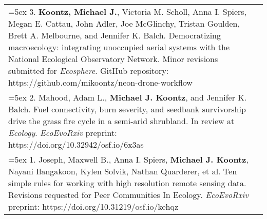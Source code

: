\begin{longtable}{@{} >{\raggedright}p{6.10in} >{\raggedleft}X @{}}

\hangindent=5ex 3. \textbf{Koontz, Michael J.}, Victoria M. Scholl, Anna I. Spiers, Megan E. Cattau, John Adler, Joe McGlinchy, Tristan Goulden, Brett A. Melbourne, and Jennifer K. Balch. Democratizing macroecology: integrating unoccupied aerial systems with the National Ecological Observatory Network. Minor revisions submitted for \emph{Ecosphere}. 
\newline GitHub repository: https://github.com/mikoontz/neon-drone-workflow & \tabularnewline

\hangindent=5ex 2. Mahood, Adam L., \textbf{Michael J. Koontz}, and Jennifer K. Balch. Fuel connectivity, burn severity, and seedbank survivorship drive the grass fire cycle in a semi-arid shrubland. In review at \emph{Ecology}. 
\newline \emph{EcoEvoRxiv} preprint: https://doi.org/10.32942/osf.io/6x3as & \tabularnewline

\hangindent=5ex 1. Joseph, Maxwell B., Anna I. Spiers, \textbf{Michael J. Koontz}, Nayani Ilangakoon, Kylen Solvik, Nathan Quarderer, et al. Ten simple rules for working with high resolution remote sensing data. Revisions requested for Peer Communities In Ecology.
\newline \emph{EcoEvoRxiv} preprint: https://doi.org/10.31219/osf.io/kehqz & \tabularnewline


\end{longtable}
